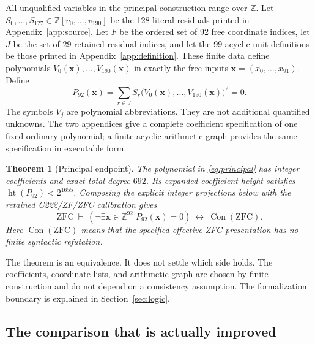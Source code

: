 \documentclass[11pt]{article}
\newtheorem{theorem}{Theorem}[section]
\newcommand{\Z}{\mathbb Z}
\newcommand{\Con}{\operatorname{Con}}
\newcommand{\ZFC}{\mathrm{ZFC}}
\newcommand{\Ht}{\operatorname{ht}}
\begin{document}
All unqualified variables in the principal construction range over
$\Z$. Let $S_0,\ldots,S_{127}\in\Z[v_0,\ldots,v_{190}]$ be the 128
literal residuals printed in Appendix~\ref{app:source}. Let $F$ be the
ordered set of 92 free coordinate indices, let $J$ be the set of 29
retained residual indices, and let the 99 acyclic unit definitions be
those printed in Appendix~\ref{app:definition}. These finite data define
polynomials $V_0(\boldsymbol x),\ldots,V_{190}(\boldsymbol x)$ in exactly
the free inputs $\boldsymbol x=(x_0,\ldots,x_{91})$. Define
\begin{equation}\label{eq:principal}
 \boxed{\displaystyle
 P_{92}(\boldsymbol x)=\sum_{r\in J}
       S_r\bigl(V_0(\boldsymbol x),\ldots,V_{190}(\boldsymbol x)\bigr)^2=0.}
\end{equation}
The symbols $V_j$ are polynomial abbreviations. They are not additional
quantified unknowns. The two appendices give a complete coefficient
specification of one fixed ordinary polynomial; a finite acyclic arithmetic
graph provides the same specification in executable form.

\begin{theorem}[Principal endpoint]\label{thm:main}
The polynomial in \eqref{eq:principal} has integer coefficients and exact
total degree $692$. Its expanded coefficient height satisfies
$\Ht(P_{92})<2^{1655}$. Composing the explicit integer projections below
with the retained C222/ZF/ZFC calibration gives
\[
 \ZFC\ \vdash\
 \left(\neg\exists\boldsymbol x\in\Z^{92}\;
                 P_{92}(\boldsymbol x)=0\right)
       \ \longleftrightarrow\ \Con(\ZFC).
\]
Here $\Con(\ZFC)$ means that the specified effective ZFC presentation
has no finite syntactic refutation.
\end{theorem}

The theorem is an equivalence. It does not settle which side holds.
The coefficients, coordinate lists, and arithmetic graph are chosen by
finite construction and do not depend on a consistency assumption.
The formalization boundary is explained in Section~\ref{sec:logic}.

\subsection{The comparison that is actually improved}
\end{document}
